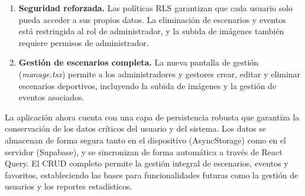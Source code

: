 \begin{enumerate}
  \item \textbf{Seguridad reforzada.} Las pol\'iticas RLS garantizan
    que cada usuario solo pueda acceder a sus propios datos. La
    eliminaci\'on de escenarios y eventos est\'a restringida al rol
    de administrador, y la subida de im\'agenes tambi\'en requiere
    permisos de administrador.

  \item \textbf{Gesti\'on de escenarios completa.} La nueva pantalla
    de gesti\'on (\textit{manage.tsx}) permite a los administradores y
    gestores crear, editar y eliminar escenarios deportivos, incluyendo
    la subida de im\'agenes y la gesti\'on de eventos asociados.
\end{enumerate}

La aplicaci\'on ahora cuenta con una capa de persistencia robusta que
garantiza la conservaci\'on de los datos cr\'iticos del usuario y del
sistema. Los datos se almacenan de forma segura tanto en el dispositivo
(AsyncStorage) como en el servidor (Supabase), y se sincronizan de
forma autom\'atica a trav\'es de React Query. El CRUD completo permite
la gesti\'on integral de escenarios, eventos y favoritos, estableciendo
las bases para funcionalidades futuras como la gesti\'on de usuarios y
los reportes estad\'isticos.
